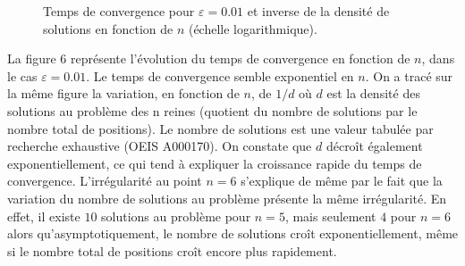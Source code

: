 \documentclass[11pt, openany]{article}
\begin{document}
\begin{figure}
  \centering

  \caption{Temps de convergence pour $\varepsilon=0.01$ et inverse de la densité de solutions en fonction de $n$  (échelle logarithmique).}
\end{figure}   

La figure $6$ représente l'évolution du temps de convergence en fonction de $n$, dans le cas $\varepsilon=0.01$. Le temps de convergence semble exponentiel en $n$. On a tracé sur la même figure la variation, en fonction de $n$, de $1/d$ où $d$ est la densité des solutions au problème des n reines (quotient du nombre de solutions par le nombre total de positions). Le nombre de solutions est une valeur tabulée par recherche exhaustive (OEIS A000170). On constate que $d$ décroît également exponentiellement, ce qui tend à expliquer la croissance rapide du temps de convergence. L'irrégularité au point $n=6$ s'explique de même par le fait que la variation du nombre de solutions au problème présente la même irrégularité. En effet, il existe $10$ solutions au problème pour $n=5$, mais seulement $4$ pour $n=6$ alors qu'asymptotiquement, le nombre de solutions croît exponentiellement, même si le nombre total de positions croît encore plus rapidement.
\end{document}
